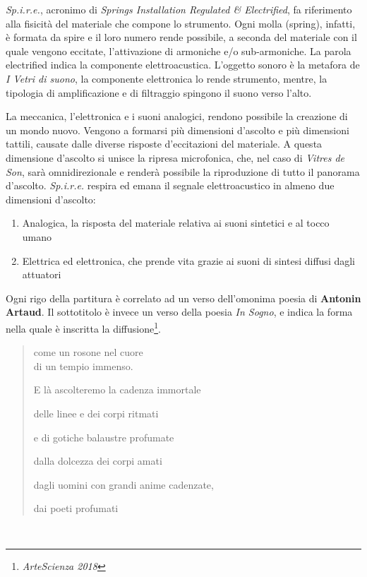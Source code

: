 \documentclass[
	a0,
	portrait
	]{a0poster}
\begin{document}
\begin{multicols}{4}
\emph{Sp.i.r.e.}, acronimo di \emph{Springs Installation Regulated \& Electrified}, fa riferimento alla fisicità del materiale che compone lo strumento. Ogni molla (spring), infatti, è formata da spire e il loro numero rende possibile, a seconda del materiale con il quale vengono eccitate, l’attivazione di armoniche e/o sub-armoniche. La parola electrified indica la componente elettroacustica. L’oggetto sonoro è la metafora de \emph{I Vetri di suono}, la componente elettronica lo rende strumento, mentre, la tipologia di amplificazione e di filtraggio spingono il suono verso l’alto.

La meccanica, l’elettronica e i suoni analogici, rendono possibile la creazione di un mondo nuovo. Vengono a formarsi più dimensioni d’ascolto e più dimensioni tattili, causate dalle diverse risposte d’eccitazioni del materiale. A questa dimensione d’ascolto si unisce la ripresa microfonica, che, nel caso di \emph{Vitres de Son}, sarà omnidirezionale e renderà possibile la riproduzione di tutto il panorama d’ascolto. \emph{Sp.i.r.e.} respira ed emana il segnale elettroacustico in almeno due dimensioni d’ascolto:

\begin{enumerate}
	\item Analogica, la risposta del materiale relativa ai suoni sintetici e al tocco umano
	\item Elettrica ed elettronica, che prende vita grazie ai suoni di sintesi diffusi dagli attuatori
\end{enumerate}

Ogni rigo della partitura è correlato ad un verso dell’omonima poesia di \textbf{\mbox{Antonin} \mbox{Artaud}}. Il sottotitolo è invece un verso della poesia \emph{In Sogno}, e indica la forma nella quale è inscritta la diffusione\footnote{\color{cpurple} \emph{ArteScienza 2018}}. 

\bigskip

\begin{quotation}
\begin{it}
\begin{flushright}
[...] come un rosone nel cuore \\ di un tempio immenso.

E là ascolteremo la cadenza immortale

delle linee e dei corpi ritmati

e di gotiche balaustre profumate

dalla dolcezza dei corpi amati

dagli uomini con grandi anime cadenzate,

dai poeti profumati
\end{flushright}
\end{it}
\end{quotation}

\vfill

~

\end{multicols}
\end{document}
